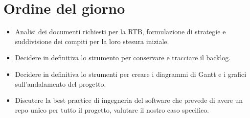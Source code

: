 

\section{Ordine del giorno}

\begin{itemize}
    \item Analisi dei documenti richiesti per la RTB, formulazione di strategie e suddivisione dei compiti per la loro stesura iniziale.
    \item Decidere in definitiva lo strumento per conservare e tracciare il backlog.
    \item Decidere in definitiva lo strumenti per creare i diagrammi di Gantt e i grafici sull'andalamento del progetto.
    \item Discutere la best practice di ingegneria del software che prevede di avere un repo unico per tutto il progetto, valutare il nostro caso specifico.
\end{itemize}
